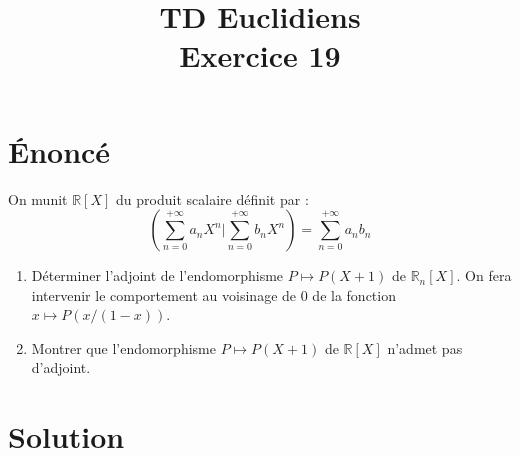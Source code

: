 \documentclass[french]{article}
\title{TD Euclidiens\\ Exercice 19}
\date{}
\newcommand{\R}{\mathbb{R}}
\begin{document}
\maketitle

\section{Énoncé}
On munit $\R[X]$ du produit scalaire définit par : $$\left( \sum_{n=0}^{+\infty}a_nX^n \bigg| \sum_{n=0}^{+\infty}b_nX^n\right)=\sum_{n=0}^{+\infty}a_nb_n$$
\begin{enumerate}
	\item Déterminer l'adjoint de l'endomorphisme $P\mapsto P(X+1)$ de $\R_n[X]$. On fera intervenir le comportement au voisinage de $0$ de la fonction $x\mapsto P(x/(1-x))$.
	\item Montrer que l'endomorphisme $P\mapsto P(X+1)$ de $\R[X]$ n'admet pas d'adjoint.
\end{enumerate}
\section{Solution}
\end{document}
